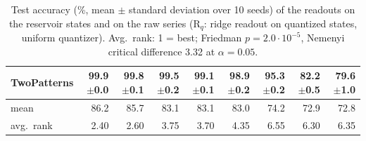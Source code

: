 \begin{table}[t]
\begin{tabular}{l|rrrrr|rrr}
TwoPatterns & 99.9{\tiny$\pm$0.0} & 99.8{\tiny$\pm$0.1} & 99.5{\tiny$\pm$0.2} & 99.1{\tiny$\pm$0.1} & 98.9{\tiny$\pm$0.2} & 95.3{\tiny$\pm$0.2} & 82.2{\tiny$\pm$0.5} & 79.6{\tiny$\pm$1.0}\\
\hline
mean & 86.2 & 85.7 & 83.1 & 83.1 & 83.0 & 74.2 & 72.9 & 72.8\\
avg.\ rank & 2.40 & 2.60 & 3.75 & 3.70 & 4.35 & 6.55 & 6.30 & 6.35\\
\end{tabular}
\vspace{-1mm}
\caption{\footnotesize Test accuracy (\%, mean $\pm$ standard deviation over 10 seeds) of the readouts on the reservoir states and on the raw series (R$_q$: ridge readout on quantized states, uniform quantizer). Avg.\ rank: 1 = best; Friedman $p = 2.0 \cdot 10^{-5}$, Nemenyi critical difference 3.32 at $\alpha = 0.05$.}
\label{tab.results}
\vspace{-4mm}
\end{table}
